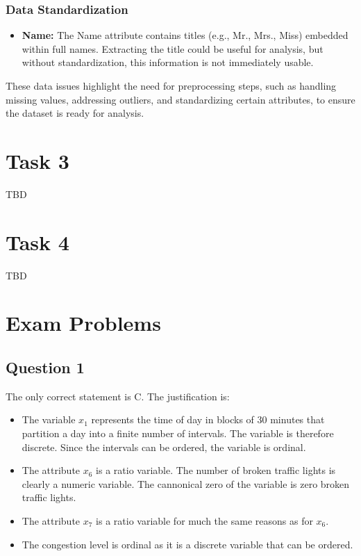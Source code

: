 \documentclass[twoside,11pt]{article}
\begin{document}
\subsubsection{Data Standardization}
\begin{itemize}
    \item \textbf{Name:} The Name attribute contains titles (e.g., Mr., Mrs., Miss) embedded within full names. Extracting the title could be useful for analysis, but without standardization, this information is not immediately usable.
\end{itemize}

These data issues highlight the need for preprocessing steps, such as handling missing values, addressing outliers, and standardizing certain attributes, to ensure the dataset is ready for analysis.


\section*{Task 3}

TBD

\section*{Task 4}

TBD

\section*{Exam Problems}

\subsection*{Question 1}

The only correct statement is C. The justification is:

\begin{itemize}
\item
  The variable \(x_1\) represents the time of day in blocks of 30
  minutes that partition a day into a finite number of intervals. The
  variable is therefore discrete. Since the intervals can be ordered,
  the variable is ordinal.
\item
  The attribute \(x_6\) is a ratio variable. The number of broken
  traffic lights is clearly a numeric variable. The cannonical zero of
  the variable is zero broken traffic lights.
\item
  The attribute \(x_7\) is a ratio variable for much the same reasons as
  for \(x_6\).
\item
  The congestion level is ordinal as it is a discrete variable that can
  be ordered.
\end{itemize}
\end{document}
